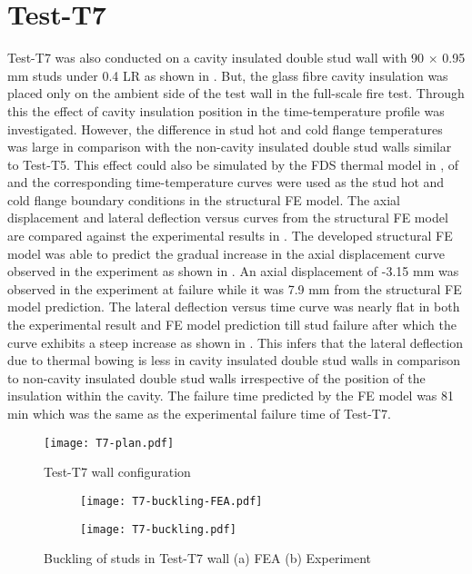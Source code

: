 \section*{Test-T7}

Test-T7 was also conducted on a cavity insulated double stud wall with 90 $\times$ 0.95 mm studs under 0.4 LR as shown in . But, the glass fibre cavity insulation was placed only on the ambient side of the test wall in the full-scale fire test. Through this the effect of cavity insulation position in the time-temperature profile was investigated. However, the difference in stud hot and cold flange temperatures was large in comparison with the non-cavity insulated double stud walls similar to Test-T5. This effect could also be simulated by the FDS thermal model in , of  and the corresponding time-temperature curves were used as the stud hot and cold flange boundary conditions in the structural FE model. The axial displacement and lateral deflection versus curves from the structural FE model are compared against the experimental results in . The developed structural FE model was able to predict the gradual increase in the axial displacement curve observed in the experiment as shown in . An axial displacement of -3.15 mm was observed in the experiment at failure while it was 7.9 mm from the structural FE model prediction. The lateral deflection versus time curve was nearly flat in both the experimental result and FE model prediction till stud failure after which the curve exhibits a steep increase as shown in . This infers that the lateral deflection due to thermal bowing is less in cavity insulated double stud walls in comparison to non-cavity insulated double stud walls irrespective of the position of the insulation within the cavity. The failure time predicted by the FE model was 81 min which was the same as the experimental failure time of Test-T7.
\begin{figure}[!htbp]
	\centering
			\texttt{[image: T7-plan.pdf]}\\
		\caption{Test-T7 wall configuration}
		\label{fig:T7-plan-FEA}
\end{figure}
\begin{figure}[!htbp]
	\centering
	\begin{subfigure}[b]{0.85\textwidth}
		\centering
		\texttt{[image: T7-buckling-FEA.pdf]}
		\caption{}
		\label{subfig:T7-buckling-FEA}
	\end{subfigure}
	\begin{subfigure}[b]{0.35\textwidth}
		\centering
		\texttt{[image: T7-buckling.pdf]}
		\caption{}
		\label{subfig:T7-buckling-FEA-Exp}
	\end{subfigure}
	   \caption{Buckling of studs in Test-T7 wall (a) FEA (b) Experiment}
	   \label{fig:T7-buckling-FE-vs-Exp}
\end{figure} 

